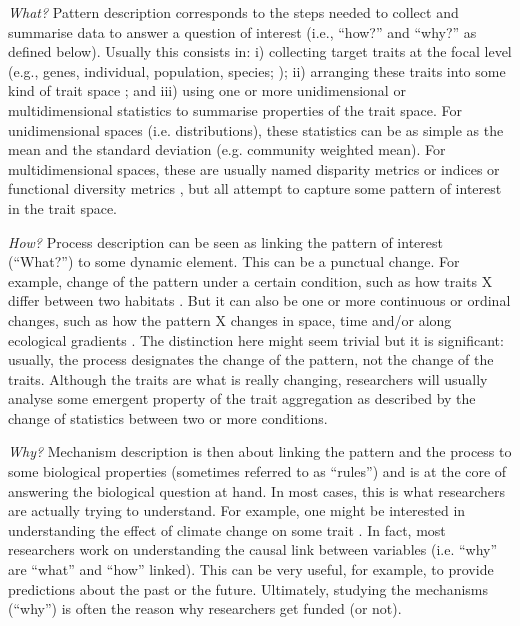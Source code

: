 \documentclass[12pt,letterpaper]{article}
\begin{document}
\textit{What?} Pattern description corresponds to the steps needed to collect and summarise data to answer a question of interest (i.e., ``how?'' and ``why?'' as defined below).
Usually this consists in: i) collecting target traits at the focal level (e.g., genes, individual, population, species; \citealt{violle2007let}); ii) arranging these traits into some kind of trait space \citep{guillerme2020disparities, mammola2021concepts}; and iii) using one or more unidimensional or multidimensional statistics to summarise properties of the trait space.
For unidimensional spaces (i.e. distributions), these statistics can be as simple as the mean and the standard deviation (e.g. community weighted mean).
For multidimensional spaces, these are usually named disparity metrics or indices \citep{guillerme2020disparities} or functional diversity metrics \citep{mammola2021concepts}, but all attempt to capture some pattern of interest in the trait space.

\textit{How?} Process description can be seen as linking the pattern of interest (``What?'') to some dynamic element.
This can be a punctual change.
For example, change of the pattern under a certain condition, such as how traits X differ between two habitats \citep{martinez2021habitat}.
But it can also be one or more continuous or ordinal changes, such as how the pattern X changes in space, time and/or along ecological gradients \citep{belmaker2013spatial, jarzyna2018taxonomic,lamanna2014functional,bjorkman2018plant,mclean2021trait}.
The distinction here might seem trivial but it is significant: usually, the process designates the change of the pattern, not the change of the traits.
Although the traits are what is really changing, researchers will usually analyse some emergent property of the trait aggregation as described by the change of statistics between two or more conditions.

\textit{Why?} Mechanism description is then about linking the pattern and the process to some biological properties (sometimes referred to as ``rules'') and is at the core of answering the biological question at hand.
In most cases, this is what researchers are actually trying to understand.
For example, one might be interested in understanding the effect of climate change on some trait \citep{boonman2022trait}.
In fact, most researchers work on understanding the causal link between variables (i.e. ``why'' are ``what'' and ``how'' linked).
This can be very useful, for example, to provide predictions about the past or the future.
Ultimately, studying the mechanisms (``why'') is often the reason why researchers get funded (or not).
\end{document}
